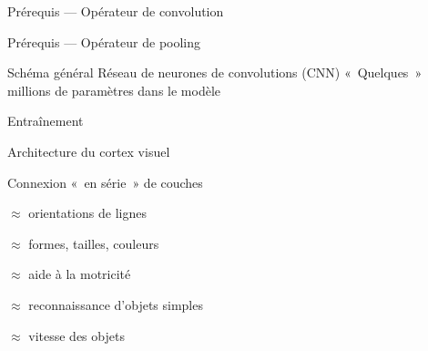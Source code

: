 \begin{frame}{Prérequis --- Opérateur de convolution}
\end{frame}

\begin{frame}{Prérequis --- Opérateur de pooling}
\end{frame}

\begin{frame}{Schéma général}
  Réseau de neurones de convolutions (CNN)
  «~Quelques~» millions de paramètres dans le modèle
\end{frame}

\begin{frame}{Entraînement}
\end{frame}

\begin{frame}{Architecture du cortex visuel}
  \begin{minipage}[l]{0.55\linewidth}
  \end{minipage}\hfill
  \begin{minipage}[l]{0.44\linewidth}
    Connexion «~en série~» de couches
    \begin{description}[<+->]
    \item[V1] $\approx$ orientations de lignes
    \item[V2] $\approx$ formes, tailles, couleurs
    \item[V3] $\approx$ aide à la motricité
    \item[V4] $\approx$ reconnaissance d'objets simples
    \item[V5] $\approx$ vitesse des objets
    \end{description}
  \end{minipage}\hfill
\end{frame}
